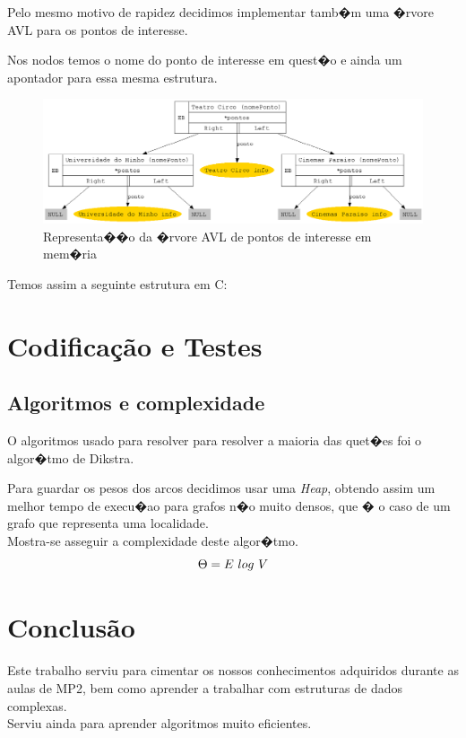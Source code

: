 \documentclass[11pt,a4paper]{article}
\newenvironment{mtc}{\secttoc\sectlof}{\pagebreak}
\begin{document}
\begin{mtc}
Pelo mesmo motivo de rapidez decidimos implementar tamb�m uma �rvore \textsf{AVL} para os pontos de interesse.

Nos nodos temos o nome do ponto de interesse em quest�o e ainda um apontador para essa mesma estrutura.
\begin{figure}[!ht]\label{avl_pontos}
    \centering
        \includegraphics[width=1\textwidth]{stuff/avl_pontos.png}
    \caption{Representa��o da �rvore \textsf{AVL} de pontos de interesse em mem�ria}
\end{figure}

Temos assim a seguinte estrutura em \textsf{C}:
\lstset{language=C_ulisses}

\end{mtc}

\section{Codifica\c c\~ ao e Testes}
\begin{mtc}
\subsection{Algoritmos e complexidade}
O algoritmos usado para resolver para resolver a maioria das quet�es foi o algor�tmo de \textsf{Dikstra}.

Para guardar os pesos dos arcos decidimos usar uma \textit{Heap}, obtendo assim um melhor tempo de execu�ao para grafos
n�o muito densos, que � o caso de um grafo que representa uma localidade.
\\
Mostra-se asseguir a complexidade deste algor�tmo.
\\
\begin{displaymath}
 \Theta = E\textrm{\space}log\textrm{\space}V
\end{displaymath}

\end{mtc}
\section{Conclus\~ao}
Este trabalho serviu para cimentar os nossos conhecimentos adquiridos durante as aulas de \textsf{MP2}, bem como
aprender a trabalhar com estruturas de dados complexas.
\\
Serviu ainda para aprender algoritmos muito eficientes.
\end{document}
